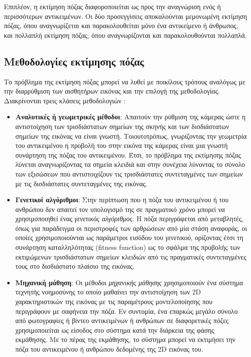 Επιπλέον, η εκτίμηση πόζας διαφοροποιείται ως προς την αναγνώριση ενός ή περισσότερων αντικειμένων. Οι δύο προσεγγίσεις αποκαλούνται μεμονωμένη εκτίμηση πόζας, όπου αναγνωρίζεται και παρακολουθείται μόνο ένα αντικείμενο ή άνθρωπος, και πολλαπλή εκτίμηση πόζας, όπου αναγνωρίζονται και παρακολουθούνται πολλαπλά.

\subsection{Μεθοδολογίες εκτίμησης πόζας}

Το πρόβλημα της εκτίμηση πόζας μπορεί να λυθεί με ποικίλους τρόπους αναλόγως με την διαρρύθμιση των αισθητήρων εικόνας και την επιλογή της μεθοδολογίας. Διακρίνονται τρεις κλάσεις μεθοδολογιών \cite{computer_vision_pose_estimation}:

\begin{itemize}
    \item \textbf{Αναλυτικές ή γεωμετρικές μέθοδοι}: Απαιτούν την ρύθμιση της κάμερας ώστε η αντιστοίχηση των τρισδιάστατων σημείων της σκηνής και των δισδιάστατων σημείων της εικόνας να είναι γνωστή. Τοιουτοτρόπως, γνωρίζοντας την γεωμετρία του αντικειμένου η προβολή του στην εικόνα της κάμερας είναι μια γνωστή συνάρτηση της πόζας του αντικειμένου. Έτσι, το πρόβλημα της εκτίμησης πόζας λύνεται αναγνωρίζοντας τα σημεία κλειδιά και στην συνέχεια λύνοντας το σύνολο των εξισώσεων που αντιστοιχίζουν τις τρισδιάστατες συντεταγμένες των σημείων με τις δισδιάστατες συντεταγμένες της εικόνας.
    \item \textbf{Γενετικοί αλγόριθμοι}: Στην περίπτωση που η πόζα του αντικειμένου ή του ανθρώπου δεν απαιτεί τον υπολογισμό της σε πραγματικό χρόνο μπορεί να χρησιμοποιηθεί ένας \textsl{γενετικός αλγόριθμος}. Η πόζα περιγράφεται από μεταβλητές, όπως για παράδειγμα οι περιστροφές των αρθρώσεων από μία στάση αναφοράς, οι οποίες χρησιμοποιούνται ως παράμετροι εισόδου του \textsl{γενετικού}, ορίζοντας έτσι τη συνάρτηση καταλληλότητας (fitness function) ως το σφάλμα της προβολής των εκτιμώμενων τρισδιάστατων σημείων κλειδιών από τις πραγματικές συντεταγμένες τους στο δισδιάστατο πλαίσιο της εικόνας. 
    \item \textbf{Μηχανική μάθηση}: Οι μέθοδοι \textsl{μηχανικής μάθησης} χρησιμοποιούν ένα σύστημα τεχνητής νοημοσύνης το οποίο μαθαίνει την αντιστοίχηση των 2D χαρακτηριστικών της εικόνας με τις παραμέτρους μοντελοποίησης που περιγράφουν με σαφήνεια την πόζα. Εν συντομία, ένα επαρκώς μεγάλο σύνολο από φωτογραφίες ή βίντεο αντικειμένων ή ανθρώπων σε διαφορετικές πόζες χρησιμοποιείται ως είσοδος στο σύστημα κατά την διάρκεια της φάσης εκμάθησης. Με το πέρας της εκμάθησης, το σύστημα μπορεί να εκτιμήσει την πόζα του αντικειμένου ή ανθρώπου δεδομένης της 2D εικόνας του.
\end{itemize}

